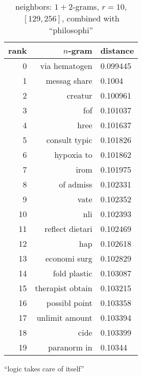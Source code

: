 \begin{table}[t]
\begin{subtable}[t]{.45\textwidth}
\begin{tabularx}{\textwidth}{r R l}
            \toprule
            rank & $n$-gram & distance\\
            \midrule
            \num{0} & via hematogen & \num{0.099445}\\
            \num{1} & messag share & \num{0.1004}\\
            \num{2} & creatur & \num{0.100961}\\
            \num{3} & fof & \num{0.101037}\\
            \num{4} & hree & \num{0.101637}\\
            \num{5} & consult typic & \num{0.101826}\\
            \midrule
            \num{6} & hypoxia to & \num{0.101862}\\
            \num{7} & irom & \num{0.101975}\\
            \num{8} & of admiss & \num{0.102331}\\
            \num{9} & vate & \num{0.102352}\\
            \num{10} & nli & \num{0.102393}\\
            \num{11} & reflect dietari & \num{0.102469}\\
            \num{12} & hap & \num{0.102618}\\
            \num{13} & economi surg & \num{0.102829}\\
            \num{14} & fold plastic & \num{0.103087}\\
            \num{15} & therapist obtain & \num{0.103215}\\
            \num{16} & possibl point & \num{0.103358}\\
            \num{17} & unlimit amount & \num{0.103394}\\
            \num{18} & cide & \num{0.103399}\\
            \num{19} & paranorm in & \num{0.10344}\\
            \bottomrule
        \end{tabularx}
        \caption{\enquote{logic takes care of itself}}\label{tab:ranking_chance2_2}
    \end{subtable}
    \caption{neighbors: $1+2$-grams, $r = 10$, $[129,256]$, combined with \enquote{philosophi}}\label{tab:ranking_chance2}
\end{table}

